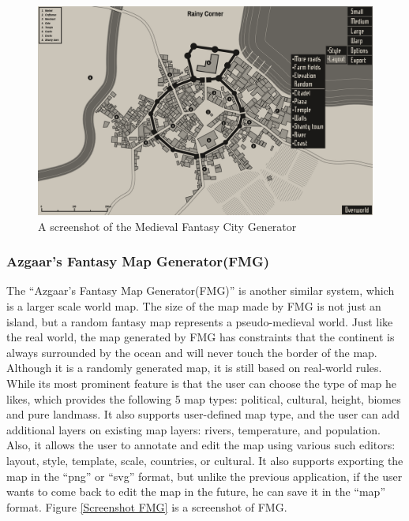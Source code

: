 \begin{figure}[!htb]
\centering
\includegraphics[width=\textwidth]{section01/assets/screenshot_MFCG.png}
\caption[A screenshot of the Medieval Fantasy City Generator]{\label{Screenshot MFCG}A screenshot of the Medieval Fantasy City Generator}
\end{figure}

\subsubsection{Azgaar's Fantasy Map Generator(FMG)}
The ``Azgaar's Fantasy Map Generator(FMG)'' is another similar system, which is a larger scale world map. The size of the map made by FMG is not just an island, but a random fantasy map represents a pseudo-medieval world. Just like the real world, the map generated by FMG has constraints that the continent is always surrounded by the ocean and will never touch the border of the map. Although it is a randomly generated map, it is still based on real-world rules. While its most prominent feature is that the user can choose the type of map he likes, which provides the following 5 map types: political, cultural, height, biomes and pure landmass. It also supports user-defined map type, and the user can add additional layers on existing map layers: rivers, temperature, and population. Also, it allows the user to annotate and edit the map using various such editors: layout, style, template, scale, countries, or cultural. It also supports exporting the map in the ``png'' or ``svg'' format, but unlike the previous application, if the user wants to come back to edit the map in the future, he can save it in the ``map'' format. Figure \ref{Screenshot FMG} is a screenshot of FMG.

